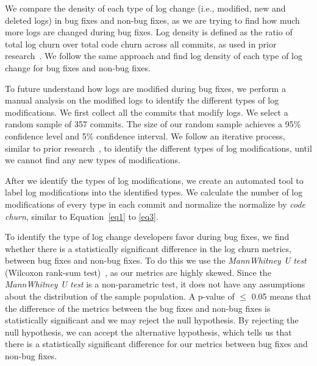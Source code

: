 We compare the density of each type of log change (i.e., modified, new and deleted logs) in bug fixes and non-bug fixes, as we are trying to find how much more logs are changed during bug fixes. Log density is defined as the ratio of total log churn over total code churn across all commits, as used in prior research~\cite{Characterizinglogs}. We follow the same approach and find log density of each type of log change for bug fixes and non-bug fixes.


To future understand how logs are modified during bug fixes, we perform a manual analysis on the modified logs to identify the different types of log modifications. We first collect all the commits that modify logs. We select a random sample of 357 commits. The size of our random sample achieves a 95\% confidence level and 5\% confidence interval. We follow an iterative process, similar to prior research~\cite{seaman1999qualitative}, to identify the different types of log modifications, until we cannot find any new types of modifications. 

After we identify the types of log modifications, we create an automated tool to label log modifications into the identified types. We calculate the number of log modifications of every type in each commit and normalize the normalize by {\em code churn}, similar to Equation~\ref{eq1} to \ref{eq3}.

To identify the type of log change developers favor during bug fixes, we find whether there is a statistically significant difference in the log churn metrics, between bug fixes and non-bug fixes. To do this we use the \textsl{MannWhitney U test} (Wilcoxon rank-sum test)~\cite{Gehan1965}, as our metrics are highly skewed. Since the {\em MannWhitney U test} is a non-parametric test, it does not have any assumptions about the distribution of the sample population. A p-value of \ensuremath{\le} 0.05 means that the difference of the metrics between the bug fixes and non-bug fixes is statistically significant and we may reject the null hypothesis. By rejecting the null hypothesis, we can accept the alternative hypothesis, which tells us that there is a statistically significant difference for our metrics between bug fixes and non-bug fixes.


